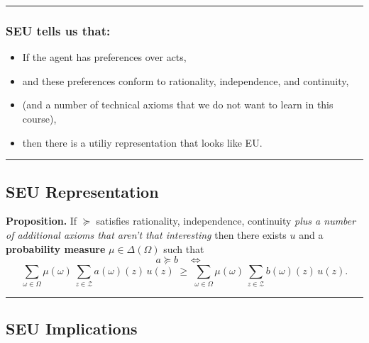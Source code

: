 \documentclass[
  letterpaper,
  DIV=11,
  numbers=noendperiod]{scrartcl}
\providecommand{\tightlist}{%
  \setlength{\itemsep}{0pt}\setlength{\parskip}{0pt}}\usepackage{longtable,booktabs,array}
\begin{document}
\begin{center}\rule{0.5\linewidth}{0.5pt}\end{center}

\subsubsection{SEU tells us that:}\label{seu-tells-us-that}

\begin{itemize}
\tightlist
\item
  If the agent has preferences over acts,
\item
  and these preferences conform to rationality, independence, and
  continuity,
\item
  (and a number of technical axioms that we do not want to learn in this
  course),
\item
  then there is a utiliy representation that looks like EU.
\end{itemize}

\begin{center}\rule{0.5\linewidth}{0.5pt}\end{center}

\subsection{SEU Representation}\label{seu-representation}

\label{prop:SEUT}
\textbf{Proposition.} If \(\succeq\) satisfies rationality,
independence, continuity \emph{plus a number of additional axioms that
aren't that interesting} then there exists \(u\) and a
\textbf{probability measure} \(\mu \in\Delta(\Omega)\) such that \[
a\succeq b \quad\Longleftrightarrow\quad 
\] \[
\sum_{\omega\in\Omega} \mu(\omega)\, \sum_{z\in\mathcal{Z}} a(\omega)(z)\,u(z)
\;\ge\; \sum_{\omega\in\Omega} \mu(\omega)\, \sum_{z\in\mathcal{Z}} b(\omega)(z)\,u(z).
\]

\begin{center}\rule{0.5\linewidth}{0.5pt}\end{center}

\subsection{SEU Implications}\label{seu-implications}
\end{document}

